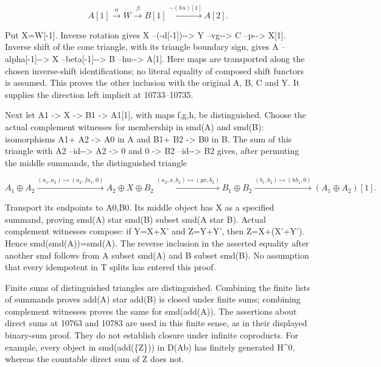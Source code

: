\documentclass[11pt]{article}
\begin{document}
\[
 A[1]\xrightarrow\alpha W\xrightarrow\beta B[1]
       \xrightarrow{-(hu)[1]} A[2].
\]

Put X\allowbreak{}=W[-1]\allowbreak{}. Inverse rotation gives X --(-d[-1]\allowbreak{})\allowbreak{}-\allowbreak{}-> Y --vg-\allowbreak{}-> C --p-\allowbreak{}-> X[1]\allowbreak{}. Inverse shift of the cone triangle,\allowbreak{} with its triangle boundary sign,\allowbreak{} gives A --alpha[-1]\allowbreak{}-\allowbreak{}-> X --beta[-1]\allowbreak{}-\allowbreak{}-> B --hu-\allowbreak{}-> A[1]\allowbreak{}. Here maps are transported along the chosen inverse-shift identifications; no literal equality of composed shift functors is assumed. This proves the other inclusion with the original A,\allowbreak{} B,\allowbreak{} C and Y. It supplies the direction left implicit at 10733–\allowbreak{}10735.

Next let A1 \allowbreak{}-> X \allowbreak{}-> B1 \allowbreak{}-> A1[1]\allowbreak{},\allowbreak{} with maps f,\allowbreak{}g,\allowbreak{}h,\allowbreak{} be distinguished. Choose the actual complement witnesses for membership in smd(A)\allowbreak{} and smd(B)\allowbreak{}:\allowbreak{} isomorphisms A1\allowbreak{}+ A2 \allowbreak{}-> A0 in A and B1\allowbreak{}+ B2 \allowbreak{}-> B0 in B. The sum of this triangle with A2 --id-\allowbreak{}-> A2 \allowbreak{}-> 0 and 0 \allowbreak{}-> B2 --id-\allowbreak{}-> B2 gives,\allowbreak{} after permuting the middle summands,\allowbreak{} the distinguished triangle

\[
 A_1\oplus A_2
 \xrightarrow{(a_1,a_2)\mapsto(a_2,f a_1,0)}
 A_2\oplus X\oplus B_2
 \xrightarrow{(a_2,x,b_2)\mapsto(gx,b_2)}
 B_1\oplus B_2
 \xrightarrow{(b_1,b_2)\mapsto(hb_1,0)}
 (A_1\oplus A_2)[1].
\]

Transport its endpoints to A0,\allowbreak{}B0. Its middle object has X as a specified summand,\allowbreak{} proving smd(A)\allowbreak{} star smd(B)\allowbreak{} subset smd(A star B)\allowbreak{}. Actual complement witnesses compose:\allowbreak{} if Y\allowbreak{}=X\allowbreak{}+X' and Z\allowbreak{}=Y\allowbreak{}+Y',\allowbreak{} then Z\allowbreak{}=X\allowbreak{}+(X'\allowbreak{}+Y')\allowbreak{}. Hence smd(smd(A)\allowbreak{})\allowbreak{}\allowbreak{}=smd(A)\allowbreak{}. The reverse inclusion in the asserted equality after another smd follows from A subset smd(A)\allowbreak{} and B subset smd(B)\allowbreak{}. No assumption that every idempotent in T splits has entered this proof.

Finite sums of distinguished triangles are distinguished. Combining the finite lists of summands proves add(A)\allowbreak{} star add(B)\allowbreak{} is closed under finite sums; combining complement witnesses proves the same for smd(add(A)\allowbreak{})\allowbreak{}. The assertions about direct sums at 10763 and 10783 are used in this finite sense,\allowbreak{} as in their displayed binary-sum proof. They do not establish closure under infinite coproducts. For example,\allowbreak{} every object in smd(add(\{Z\})\allowbreak{})\allowbreak{} in D(Ab)\allowbreak{} has finitely generated H\textasciicircum{}0,\allowbreak{} whereas the countable direct sum of Z does not.
\end{document}
